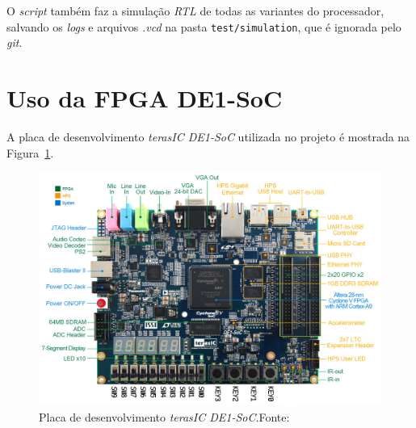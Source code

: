     { O \textit{script} também faz a simulação \textit{RTL} de todas as variantes
        do processador, salvando os \textit{logs} e arquivos \textit{.vcd} na
        pasta \texttt{test/simulation}, que é ignorada pelo \textit{git}.
    }

    \section{Uso da FPGA DE1-SoC}
    { A placa de desenvolvimento \textit{terasIC DE1-SoC} utilizada no projeto
        é mostrada na Figura~\ref{fig:de1_soc}.
    }

    \begin{figure}[H]
    \centering
        \includegraphics[width=.9\linewidth]{../images/fpga/de1_soc_subs.png}
        \caption[Placa de desenvolvimento \textit{terasIC DE1-SoC}.]{Placa de
        desenvolvimento \textit{terasIC DE1-SoC}.\quad Fonte:~\cite{terasic_de1_soc}}
        \label{fig:de1_soc}
    \end{figure}

